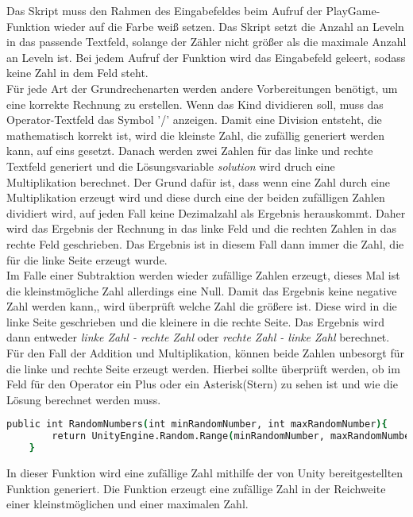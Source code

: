 Das Skript muss den Rahmen des Eingabefeldes beim Aufruf der PlayGame-Funktion wieder auf die Farbe weiß setzen. Das Skript setzt die Anzahl an Leveln in das passende Textfeld, solange der Zähler nicht größer als die maximale Anzahl an Leveln ist. Bei jedem Aufruf der Funktion wird das Eingabefeld geleert, sodass keine Zahl in dem Feld steht.\\
Für jede Art der Grundrechenarten werden andere Vorbereitungen benötigt, um eine korrekte Rechnung zu erstellen. Wenn das Kind dividieren soll, muss das Operator-Textfeld das Symbol '/' anzeigen. Damit eine Division entsteht, die mathematisch korrekt ist, wird die kleinste Zahl, die zufällig generiert werden kann, auf eins gesetzt. Danach werden zwei Zahlen für das linke und rechte Textfeld generiert und die Lösungsvariable \textit{solution} wird druch eine Multiplikation berechnet. Der Grund dafür ist, dass wenn eine Zahl durch eine Multiplikation erzeugt wird und diese durch eine der beiden zufälligen Zahlen dividiert wird, auf jeden Fall keine Dezimalzahl als Ergebnis herauskommt. Daher wird das Ergebnis der Rechnung in das linke Feld und die rechten Zahlen in das rechte Feld geschrieben. Das Ergebnis ist in diesem Fall dann immer die Zahl, die für die linke Seite erzeugt wurde.\\
Im Falle einer Subtraktion werden wieder zufällige Zahlen erzeugt, dieses Mal ist die kleinstmögliche Zahl allerdings eine Null. Damit das Ergebnis keine negative Zahl werden kann,, wird überprüft welche Zahl die größere ist. Diese wird in die linke Seite geschrieben und die kleinere in die rechte Seite. Das Ergebnis wird dann entweder \textit{linke Zahl - rechte Zahl} oder \textit{rechte Zahl - linke Zahl} berechnet.\\
Für den Fall der Addition und Multiplikation, können beide Zahlen unbesorgt für die linke und rechte Seite erzeugt werden. Hierbei sollte überprüft werden, ob im Feld für den Operator ein Plus oder ein Asterisk(Stern) zu sehen ist und wie die Lösung berechnet werden muss.\\
\begin{lstlisting}[language=csh, caption={MathOperations.cs RandomNumber-Funktion}]
	public int RandomNumbers(int minRandomNumber, int maxRandomNumber){
		return UnityEngine.Random.Range(minRandomNumber, maxRandomNumber);
	}
\end{lstlisting}
In dieser Funktion wird eine zufällige Zahl mithilfe der von Unity bereitgestellten Funktion generiert. Die Funktion erzeugt eine zufällige Zahl in der Reichweite einer kleinstmöglichen und einer maximalen Zahl.\\
